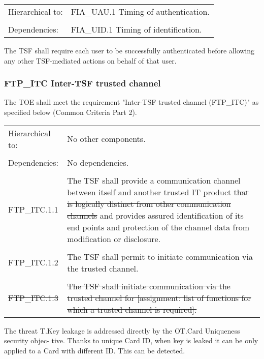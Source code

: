 \documentclass[10pt,titlepage]{article}
\begin{document}
 \begin{table}[!ht]
	\begin{tabular}{ p{3cm}  p{10cm} }
			Hierarchical to:& FIA\_UAU.1 Timing of authentication. \\ 
									&\\
			Dependencies: & FIA\_UID.1 Timing of identification.\\

	 \end{tabular}
 \end{table}
 
  The TSF shall require each user to be successfully authenticated before
allowing any other TSF-mediated actions on behalf of that user.

 \subsubsection{FTP\_ITC Inter-TSF trusted channel}
The TOE shall meet the requirement "Inter-TSF trusted channel (FTP\_ITC)"  as specified below (Common Criteria Part 2).
 \begin{table}[!ht]
	\begin{tabular}{ p{3cm}  p{10cm} }
			Hierarchical to:& No other components. \\ 
									&\\
			Dependencies: & No dependencies.\\
									&\\
			FTP\_ITC.1.1 & The TSF shall provide a communication channel between itself and another trusted IT product \sout{that is logically distinct from other communication channels} and provides assured identification of its end points and protection of the channel data from modification or disclosure. \\
			& \\
						FTP\_ITC.1.2 & The TSF shall permit to initiate communication via the trusted channel. \\
			& \\
			\sout{FTP\_ITC.1.3} &	\sout{The TSF shall initiate communication via the trusted channel for [assignment: list of functions for which a trusted channel is required].}\\		
	 \end{tabular}
 \end{table}
 
The threat T.Key leakage is addressed directly by the OT.Card Uniqueness security objec-
tive. Thanks to unique Card ID, when key is leaked it can be only applied to a Card with different ID. This can be detected.
\end{document}
